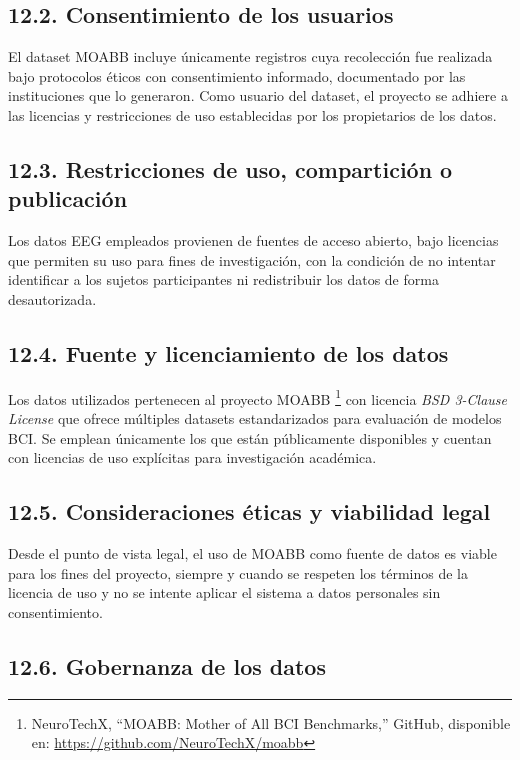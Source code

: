 \documentclass[
11pt, %
]{charter}
\begin{document}
\subsection*{12.2. Consentimiento de los usuarios}

El dataset MOABB incluye únicamente registros cuya recolección fue realizada bajo protocolos éticos con consentimiento informado, documentado por las instituciones que lo generaron. Como usuario del dataset, el proyecto se adhiere a las licencias y restricciones de uso establecidas por los propietarios de los datos.

\subsection*{12.3. Restricciones de uso, compartición o publicación}

Los datos EEG empleados provienen de fuentes de acceso abierto, bajo licencias que permiten su uso para fines de investigación, con la condición de no intentar identificar a los sujetos participantes ni redistribuir los datos de forma desautorizada.

\subsection*{12.4. Fuente y licenciamiento de los datos}

Los datos utilizados pertenecen al proyecto MOABB \footnote{NeuroTechX, ``MOABB: Mother of All BCI Benchmarks,'' GitHub, disponible en: \url{https://github.com/NeuroTechX/moabb}} con licencia \textit{BSD 3-Clause License}
que ofrece múltiples datasets estandarizados para evaluación de modelos BCI. Se emplean únicamente los que están públicamente disponibles y cuentan con licencias de uso explícitas para investigación académica.

\subsection*{12.5. Consideraciones éticas y viabilidad legal}

Desde el punto de vista legal, el uso de MOABB como fuente de datos es viable para los fines del proyecto, siempre y cuando se respeten los términos de la licencia de uso y no se intente aplicar el sistema a datos personales sin consentimiento.

\subsection*{12.6. Gobernanza de los datos}
\end{document}

